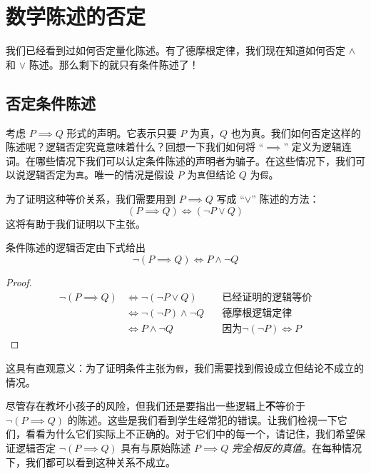 \section{数学陈述的否定}

我们已经看到过如何否定量化陈述。有了德摩根定律，我们现在知道如何否定 $\land$ 和 $\lor$ 陈述。那么剩下的就只有条件陈述了！

\subsection{否定条件陈述}

考虑 $P \implies Q$ 形式的声明。它表示只要 $P$ 为真，$Q$ 也为真。我们如何否定这样的陈述呢？逻辑否定究竟意味着什么？回想一下我们如何将 ``$\implies$'' 定义为逻辑连词。在哪些情况下我们可以认定条件陈述的声明者为骗子。在这些情况下，我们可以说逻辑否定为\verb|真|。唯一的情况是假设 $P$ 为\verb|真|但结论 $Q$ 为\verb|假|。

为了证明这种等价关系，我们需要用到 $P \implies Q$ 写成 ``$\lor$'' 陈述的方法：
\[(P \implies Q) \iff (\neg P \lor Q)\]
这将有助于我们证明以下主张。

\begin{lemma}
    条件陈述的逻辑否定由下式给出
    \[\neg (P \implies Q) \iff P \land \neg Q\]
\end{lemma}

\begin{proof}
    \begin{align*}
        \neg (P \implies Q) &\iff \neg (\neg P \lor Q) &\quad \text{已经证明的逻辑等价} \\
        &\iff \neg (\neg P) \land \neg Q &\quad \text{德摩根逻辑定律} \\
        &\iff P \land \neg Q &\quad \text{因为} \neg (\neg P) \iff P
    \end{align*}
\end{proof}

这具有直观意义：为了证明条件主张为\verb|假|，我们需要找到假设成立但结论不成立的情况。

尽管存在教坏小孩子的风险，但我们还是要指出一些逻辑上\textbf{不}等价于 $\neg (P \implies Q)$ 的陈述。这些是我们看到学生经常犯的错误。让我们检视一下它们，看看为什么它们实际上不正确的。对于它们中的每一个，请记住，我们希望保证逻辑否定 $\neg (P \implies Q)$ 具有与原始陈述 $P \implies Q$ \emph{完全相反的真值}。在每种情况下，我们都可以看到这种关系不成立。

